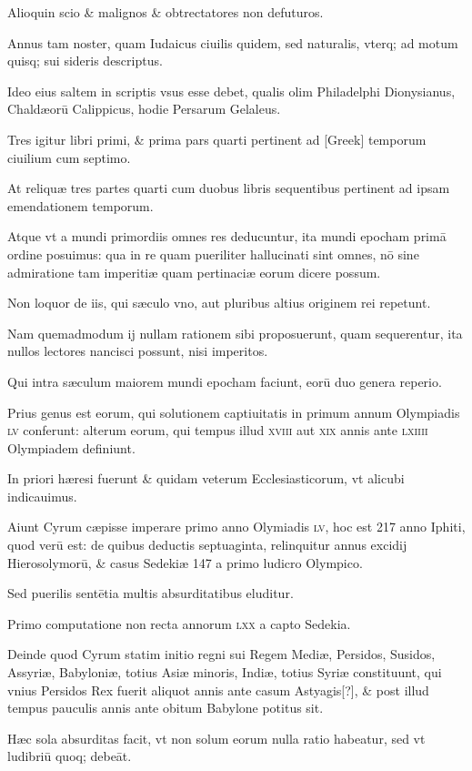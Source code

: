 \begin{parnumbers}
Alioquin scio \& malignos \& obtrectatores non defuturos. 

Annus tam noster, quam Iudaicus ciuilis quidem, sed naturalis,
vterq; ad motum quisq; sui sideris descriptus. 

Ideo eius saltem
in scriptis vsus esse debet, qualis olim Philadelphi Dionysianus,
Chaldæorū Calippicus, hodie Persarum Gelaleus. 

Tres igitur libri
primi, \& prima pars quarti pertinent ad \textgreek{[Greek]} temporum ciuilium
cum septimo.

At reliquæ tres partes quarti cum duobus libris
sequentibus pertinent ad ipsam emendationem temporum.

Atque
vt a mundi primordiis omnes res deducuntur, ita mundi epocham
primā ordine posuimus: qua in re quam pueriliter hallucinati sint
omnes, nō sine admiratione tam imperitiæ quam pertinaciæ eorum
dicere possum.

Non loquor de iis, qui sæculo vno, aut pluribus altius
originem rei repetunt.

Nam quemadmodum ij nullam rationem
sibi proposuerunt, quam sequerentur, ita nullos lectores nancisci
possunt, nisi imperitos. 

Qui intra sæculum maiorem mundi
epocham faciunt, eorū duo genera reperio.

Prius genus est eorum,
qui solutionem captiuitatis in primum annum Olympiadis \textsc{lv} conferunt:
alterum eorum, qui tempus illud \textsc{xviii} aut \textsc{xix} annis ante
\textsc{lxiiii} Olympiadem definiunt.

In priori hæresi fuerunt \&
quidam veterum Ecclesiasticorum, vt alicubi indicauimus. 

Aiunt
Cyrum cæpisse imperare primo anno Olymiadis \textsc{lv}, hoc est 217
anno Iphiti, quod verū est: de quibus deductis septuaginta, relinquitur
annus excidij Hierosolymorū, \& casus Sedekiæ 147 a primo ludicro
Olympico.

Sed puerilis sentētia multis absurditatibus eluditur.

Primo computatione non recta annorum \textsc{lxx} a capto Sedekia.

Deinde quod Cyrum statim initio regni sui Regem Mediæ, Persidos,
Susidos, Assyriæ, Babyloniæ, totius Asiæ minoris, Indiæ, totius
Syriæ constituunt, qui vnius Persidos Rex fuerit aliquot annis ante
casum Astyagis[?], \& post illud tempus pauculis annis ante obitum
Babylone potitus sit.

Hæc sola absurditas facit, vt non solum eorum
nulla ratio habeatur, sed vt ludibriū quoq; debeāt.


\end{parnumbers}
